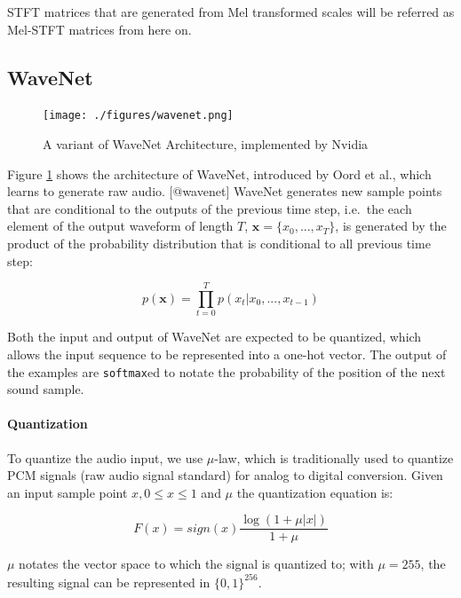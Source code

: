 \documentclass[12pt,a4paper,]{report}
\begin{document}
STFT matrices that are generated from Mel transformed scales will be
referred as Mel-STFT matrices from here on.

\hypertarget{wavenet}{%
\subsection{WaveNet}\label{wavenet}}

\begin{figure}[!h]
    \texttt{[image: ./figures/wavenet.png]}
    \centering
    \caption{A variant of WaveNet Architecture, implemented by Nvidia} \label{fig:wavenet}
\end{figure}

Figure \ref{fig:wavenet} shows the architecture of WaveNet, introduced
by Oord et al., which learns to generate raw audio. {[}@wavenet{]}
WaveNet generates new sample points that are conditional to the outputs
of the previous time step, i.e.~the each element of the output waveform
of length \(T\), \(\mathbf{x} = \{x_0, ..., x_T\}\), is generated by the
product of the probability distribution that is conditional to all
previous time step:

\begin{equation}
    p(\mathbf{x}) = \prod_{t=0}^{T} p(x_t | x_0, ..., x_{t-1})
\end{equation}

Both the input and output of WaveNet are expected to be quantized, which
allows the input sequence to be represented into a one-hot vector. The
output of the examples are \texttt{softmax}ed to notate the probability
of the position of the next sound sample.

\paragraph{Quantization}

To quantize the audio input, we use \(\mu\)-law, which is traditionally
used to quantize PCM signals (raw audio signal standard) for analog to
digital conversion. Given an input sample point \(x, 0 \leq x \leq 1\)
and \(\mu\) the quantization equation is:

\begin{equation}
    F(x) = sign(x) \frac{\log(1 + \mu \lvert x \lvert )}{1 +  \mu} \label{eq:mulaw}
\end{equation}

\(\mu\) notates the vector space to which the signal is quantized to;
with \(\mu = 255\), the resulting signal can be represented in
\(\{0, 1\}^{256}\).
\end{document}
